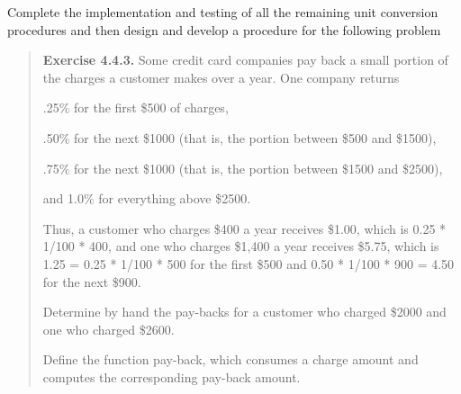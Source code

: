 \documentclass[]{tufte-handout}
\begin{document}
Complete the implementation and testing of all the remaining unit conversion procedures and then design and develop a procedure for the following problem

\begin{framed}
\begin{quote}
\textbf{Exercise 4.4.3.}   Some credit card companies pay back a small portion of the charges a customer makes over a year. One company returns

.25\% for the first \$500 of charges,

.50\% for the next \$1000 (that is, the portion between \$500 and \$1500),

.75\% for the next \$1000 (that is, the portion between \$1500 and \$2500),

and 1.0\% for everything above \$2500.

Thus, a customer who charges \$400 a year receives \$1.00, which is 0.25 * 1/100 * 400, and one who charges \$1,400 a year receives \$5.75, which is 1.25 = 0.25 * 1/100 * 500 for the first \$500 and 0.50 * 1/100 * 900 = 4.50 for the next \$900.

Determine by hand the pay-backs for a customer who charged \$2000 and one who charged \$2600.

Define the function pay-back, which consumes a charge amount and computes the corresponding pay-back amount.
\end{quote}
\end{framed}
\end{document}
